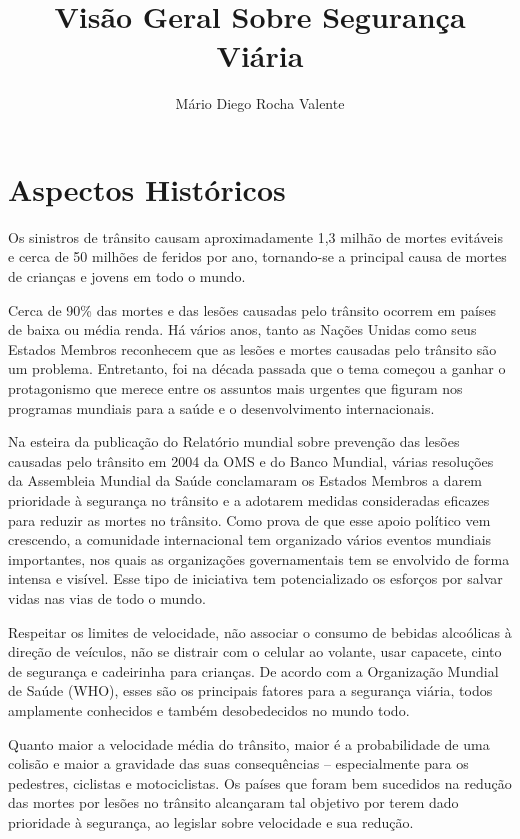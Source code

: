 \documentclass[output=paper,colorlinks,citecolor=green]{langscibook}
\title{Visão Geral Sobre Segurança Viária}
\author{Mário Diego Rocha Valente\orcid{}\affiliation{Analista de Trânsito: Estatístico} }
\begin{document}
\maketitle
\section{Aspectos Históricos}

Os sinistros de trânsito causam aproximadamente 1,3 milhão de mortes evitáveis e cerca de 50 milhões de feridos por ano, tornando-se a principal causa de mortes de crianças  e jovens em todo o mundo.\vskip0.3cm

Cerca de 90\% das mortes e das lesões causadas pelo trânsito ocorrem em países de baixa ou média renda. Há vários anos, tanto as Nações Unidas como seus Estados Membros reconhecem que as lesões e mortes causadas pelo trânsito são um problema. Entretanto, foi na década passada que o tema começou a ganhar o protagonismo que merece entre os assuntos mais urgentes que figuram nos programas mundiais para a saúde e o desenvolvimento internacionais.\vskip0.3cm

Na esteira da publicação do Relatório mundial sobre prevenção das lesões causadas pelo trânsito em 2004 da OMS e do Banco Mundial, várias resoluções da Assembleia Mundial da Saúde conclamaram os Estados Membros a darem prioridade à segurança no trânsito e a adotarem medidas consideradas eﬁcazes para reduzir as mortes no trânsito. Como prova de que esse apoio político vem crescendo, a comunidade internacional tem organizado vários eventos mundiais importantes, nos quais as organizações governamentais tem se envolvido de forma intensa e visível. Esse tipo de iniciativa tem potencializado os esforços por salvar vidas nas vias de todo o mundo.\vskip0.3cm

Respeitar os limites de velocidade, não associar o consumo de bebidas alcoólicas à direção de veículos, não se distrair com o celular ao volante, usar capacete, cinto de segurança e cadeirinha para crianças. De acordo com a Organização Mundial de Saúde (WHO), esses são os principais fatores para a segurança viária, todos amplamente conhecidos e também desobedecidos no mundo todo.\vskip0.3cm

Quanto maior a velocidade média do trânsito, maior é a probabilidade de uma colisão e maior a gravidade das suas consequências – especialmente para os pedestres, ciclistas e motociclistas. Os países que foram bem sucedidos na redução das mortes por lesões no trânsito alcançaram tal objetivo por terem dado prioridade à segurança, ao legislar sobre velocidade e sua redução.\vskip0.3cm
\end{document}
